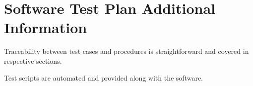 
\chapter{Software Test Plan Additional Information}

Traceability between test cases and procedures is straightforward and covered in respective sections.

Test scripts are automated and provided along with the software.

